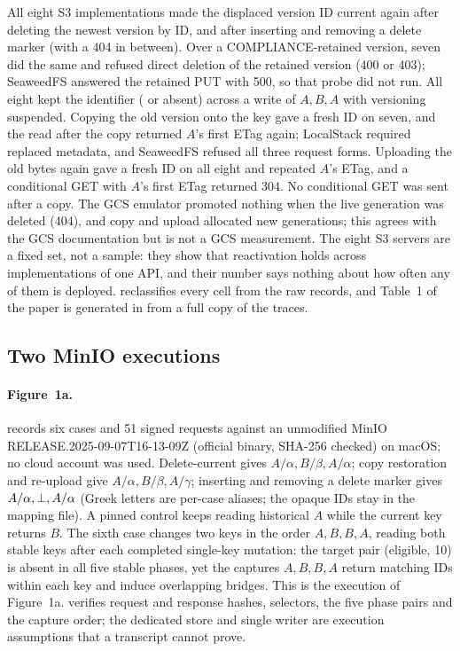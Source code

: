 All eight S3 implementations made the displaced version ID current again after
deleting the newest version by ID, and after inserting and removing a delete
marker (with a 404 in between). Over a COMPLIANCE-retained version, seven did
the same and refused direct deletion of the retained version (400 or 403);
SeaweedFS answered the retained PUT with 500, so that probe did not run. All
eight kept the identifier ( or absent) across a write of $A,B,A$
with versioning suspended. Copying the old version onto the key gave a fresh ID on seven, and the read
after the copy returned $A$'s first ETag again; LocalStack required replaced
metadata, and SeaweedFS refused all three request forms. Uploading the old bytes again gave a fresh ID on all eight
and repeated $A$'s ETag, and a conditional GET with $A$'s first ETag returned
304. No conditional GET was sent after a copy. The GCS emulator promoted
nothing when the live generation was deleted (404), and copy and upload
allocated new generations; this agrees with the GCS documentation but is not a
GCS measurement. The eight S3 servers are a fixed set, not a sample: they show
that reactivation holds across implementations of one API, and their number
says nothing about how often any of them is deployed.  reclassifies every cell from the raw records,
and Table~1 of the paper is generated in 
from a full copy of the traces.

\subsection{Two MinIO executions}
\paragraph{Figure~1a.} 
records six cases and 51 signed requests against an unmodified MinIO
RELEASE.2025-09-07T16-13-09Z (official binary, SHA-256 checked) on macOS; no
cloud account was used. Delete-current gives $A/\alpha, B/\beta, A/\alpha$;
copy restoration and re-upload give $A/\alpha, B/\beta, A/\gamma$; inserting and
removing a delete marker gives $A/\alpha,\bot,A/\alpha$ (Greek letters are
per-case aliases; the opaque IDs stay in the mapping file). A pinned control
keeps reading historical $A$ while the current key returns $B$. The sixth case
changes two keys in the order $A,B,B,A$, reading both stable keys after each
completed single-key mutation: the target pair (eligible, 10) is absent in all
five stable phases, yet the captures $A,B,B,A$ return matching IDs within each
key and induce overlapping bridges. This is the execution of Figure~1a.
 verifies request and response hashes, selectors, the five
phase pairs and the capture order; the dedicated store and single writer are
execution assumptions that a transcript cannot prove.

